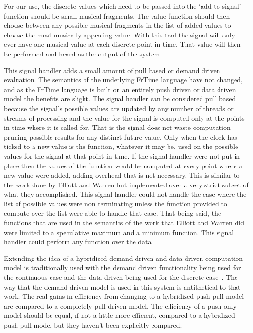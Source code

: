 \documentclass[12pt]{ucthesis}
\begin{document}
For our use, the discrete values which need to be passed into the `add-to-signal' function should be small musical fragments. The value function should then choose between any possible musical fragments in the list of added values to choose the most musically appealing value.  With this tool the signal will only ever have one musical value at each discrete point in time. That value will then be performed and heard as the output of the system. 

This signal handler adds a small amount of pull based or demand driven evaluation. The semantics of the underlying FrTime language have not changed, and as the FrTime language is built on an entirely push driven or data driven model the benefits are slight. The signal handler can be considered pull based because the signal's possible values are updated by any number of threads or streams of processing and the value for the signal is computed only at the points in time where it is called for. That is the signal does not waste computation pruning possible results for any distinct future value. Only when the clock has ticked to a new value is the function, whatever it may be, used on the possible values for the signal at that point in time. If the signal handler were not put in place then the values of the function would be computed at every point where a new value were added, adding overhead that is not necessary. This is similar to the work done by Elliott and Warren but implemented over a very strict subset of what they accomplished. This signal handler could not handle the case where the list of possible values were non terminating unless the function provided to compute over the list were able to handle that case. That being said, the functions that are used in the semantics of the work that Elliott and Warren did were limited to a speculative maximum and a minimum function. This signal handler could perform any function over the data. 


Extending the idea of a hybridized demand driven and data driven computation model is traditionally used with the demand driven functionality being used for the continuous case and the data driven being used for the discrete case~\cite{push-pull-frp}. The way that the demand driven model is used in this system is antithetical to that work. The real gains in efficiency from changing to a hybridized push-pull model are compared to a completely pull driven model. The efficiency of a push only model should be equal, if not a little more efficient, compared to a hybridized push-pull model but they haven't been explicitly compared.  
\end{document}
